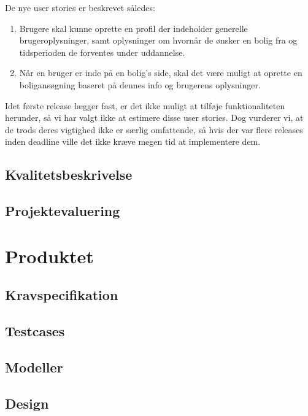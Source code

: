 \documentclass[12pt, a4paper]{report}
\begin{document}
De nye user stories er beskrevet således:

\begin{enumerate}

\item Brugere skal kunne oprette en profil der indeholder generelle brugeroplysninger, samt oplysninger om hvornår de ønsker en bolig fra og tidsperioden de forventes under uddannelse.

\item Når en bruger er inde på en bolig’s side, skal det være muligt at oprette en boligansøgning baseret på dennes info og brugerens oplysninger.

\end{enumerate}

Idet første release lægger fast, er det ikke muligt at tilføje funktionaliteten herunder, så vi har valgt ikke at estimere disse user stories. Dog vurderer vi, at de trods deres vigtighed ikke er særlig omfattende, så hvis der var flere releases inden deadline ville det ikke kræve megen tid at implementere dem.

\section{Kvalitetsbeskrivelse}


\section{Projektevaluering}


\chapter{Produktet}
\section{Kravspecifikation}

\section{Testcases}

\section{Modeller}


\section{Design}
\end{document}
